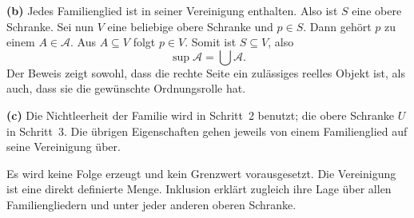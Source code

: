 \textbf{(b)} Jedes Familienglied ist in seiner Vereinigung
enthalten. Also ist $S$ eine obere Schranke.
Sei nun $V$ eine beliebige obere Schranke und $p\in S$.
Dann gehört $p$ zu einem $A\in\mathcal A$.
Aus $A\subseteq V$ folgt $p\in V$.
Somit ist $S\subseteq V$, also
\[
 \boxed{\sup\mathcal A=\bigcup\mathcal A.}
\]
Der Beweis zeigt sowohl, dass die rechte Seite ein zulässiges
reelles Objekt ist, als auch, dass sie die gewünschte Ordnungsrolle hat.

\textbf{(c)} Die Nichtleerheit der Familie wird in Schritt~2
benutzt; die obere Schranke $U$ in Schritt~3.
Die übrigen Eigenschaften gehen jeweils von einem Familienglied
auf seine Vereinigung über.

Es wird keine Folge erzeugt und kein Grenzwert vorausgesetzt.
Die Vereinigung ist eine direkt definierte Menge.
Inklusion erklärt zugleich ihre Lage über allen Familiengliedern
und unter jeder anderen oberen Schranke.
